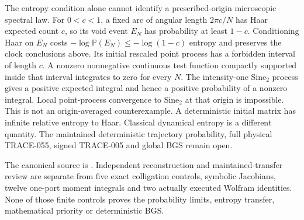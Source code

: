 The entropy condition alone cannot identify a prescribed-origin
microscopic spectral law. For $0<c<1$, a fixed arc of angular length
$2\pi c/N$ has Haar expected count $c$, so its void event $E_N$ has
probability at least $1-c$. Conditioning Haar on $E_N$ costs
$-\log\mathbb P(E_N)\le-\log(1-c)$ entropy and preserves the clock
conclusions above. Its initial rescaled point process has a forbidden
interval of length $c$. A nonzero nonnegative continuous test function
compactly supported inside that interval integrates to zero for every $N$.
The intensity-one Sine$_2$ process gives a positive expected integral
and hence a positive probability of a nonzero integral. Local
point-process convergence to Sine$_2$ at that origin is impossible.
This is not an origin-averaged counterexample. A deterministic initial
matrix has infinite relative entropy to Haar. Classical dynamical
entropy is a different quantity. The maintained deterministic
trajectory probability, full physical TRACE-055, signed TRACE-005 and
global BGS remain open.

The canonical source is
.
Independent reconstruction and maintained-transfer review are separate
from five exact colligation controls, symbolic Jacobians, twelve
one-port moment integrals and two actually executed Wolfram identities.
None of those finite controls proves the probability limits,
entropy transfer, mathematical priority or deterministic BGS.
